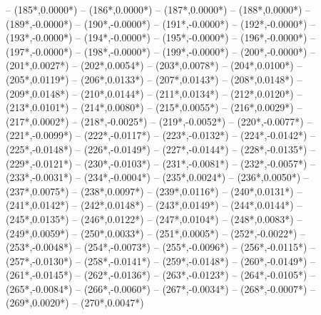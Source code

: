 {		-- ({185*\dx},{0.0000*\dy})
		-- ({186*\dx},{0.0000*\dy})
		-- ({187*\dx},{0.0000*\dy})
		-- ({188*\dx},{0.0000*\dy})
		-- ({189*\dx},{-0.0000*\dy})
		-- ({190*\dx},{-0.0000*\dy})
		-- ({191*\dx},{-0.0000*\dy})
		-- ({192*\dx},{-0.0000*\dy})
		-- ({193*\dx},{-0.0000*\dy})
		-- ({194*\dx},{-0.0000*\dy})
		-- ({195*\dx},{-0.0000*\dy})
		-- ({196*\dx},{-0.0000*\dy})
		-- ({197*\dx},{-0.0000*\dy})
		-- ({198*\dx},{-0.0000*\dy})
		-- ({199*\dx},{-0.0000*\dy})
		-- ({200*\dx},{-0.0000*\dy})
		-- ({201*\dx},{0.0027*\dy})
		-- ({202*\dx},{0.0054*\dy})
		-- ({203*\dx},{0.0078*\dy})
		-- ({204*\dx},{0.0100*\dy})
		-- ({205*\dx},{0.0119*\dy})
		-- ({206*\dx},{0.0133*\dy})
		-- ({207*\dx},{0.0143*\dy})
		-- ({208*\dx},{0.0148*\dy})
		-- ({209*\dx},{0.0148*\dy})
		-- ({210*\dx},{0.0144*\dy})
		-- ({211*\dx},{0.0134*\dy})
		-- ({212*\dx},{0.0120*\dy})
		-- ({213*\dx},{0.0101*\dy})
		-- ({214*\dx},{0.0080*\dy})
		-- ({215*\dx},{0.0055*\dy})
		-- ({216*\dx},{0.0029*\dy})
		-- ({217*\dx},{0.0002*\dy})
		-- ({218*\dx},{-0.0025*\dy})
		-- ({219*\dx},{-0.0052*\dy})
		-- ({220*\dx},{-0.0077*\dy})
		-- ({221*\dx},{-0.0099*\dy})
		-- ({222*\dx},{-0.0117*\dy})
		-- ({223*\dx},{-0.0132*\dy})
		-- ({224*\dx},{-0.0142*\dy})
		-- ({225*\dx},{-0.0148*\dy})
		-- ({226*\dx},{-0.0149*\dy})
		-- ({227*\dx},{-0.0144*\dy})
		-- ({228*\dx},{-0.0135*\dy})
		-- ({229*\dx},{-0.0121*\dy})
		-- ({230*\dx},{-0.0103*\dy})
		-- ({231*\dx},{-0.0081*\dy})
		-- ({232*\dx},{-0.0057*\dy})
		-- ({233*\dx},{-0.0031*\dy})
		-- ({234*\dx},{-0.0004*\dy})
		-- ({235*\dx},{0.0024*\dy})
		-- ({236*\dx},{0.0050*\dy})
		-- ({237*\dx},{0.0075*\dy})
		-- ({238*\dx},{0.0097*\dy})
		-- ({239*\dx},{0.0116*\dy})
		-- ({240*\dx},{0.0131*\dy})
		-- ({241*\dx},{0.0142*\dy})
		-- ({242*\dx},{0.0148*\dy})
		-- ({243*\dx},{0.0149*\dy})
		-- ({244*\dx},{0.0144*\dy})
		-- ({245*\dx},{0.0135*\dy})
		-- ({246*\dx},{0.0122*\dy})
		-- ({247*\dx},{0.0104*\dy})
		-- ({248*\dx},{0.0083*\dy})
		-- ({249*\dx},{0.0059*\dy})
		-- ({250*\dx},{0.0033*\dy})
		-- ({251*\dx},{0.0005*\dy})
		-- ({252*\dx},{-0.0022*\dy})
		-- ({253*\dx},{-0.0048*\dy})
		-- ({254*\dx},{-0.0073*\dy})
		-- ({255*\dx},{-0.0096*\dy})
		-- ({256*\dx},{-0.0115*\dy})
		-- ({257*\dx},{-0.0130*\dy})
		-- ({258*\dx},{-0.0141*\dy})
		-- ({259*\dx},{-0.0148*\dy})
		-- ({260*\dx},{-0.0149*\dy})
		-- ({261*\dx},{-0.0145*\dy})
		-- ({262*\dx},{-0.0136*\dy})
		-- ({263*\dx},{-0.0123*\dy})
		-- ({264*\dx},{-0.0105*\dy})
		-- ({265*\dx},{-0.0084*\dy})
		-- ({266*\dx},{-0.0060*\dy})
		-- ({267*\dx},{-0.0034*\dy})
		-- ({268*\dx},{-0.0007*\dy})
		-- ({269*\dx},{0.0020*\dy})
		-- ({270*\dx},{0.0047*\dy})
}
